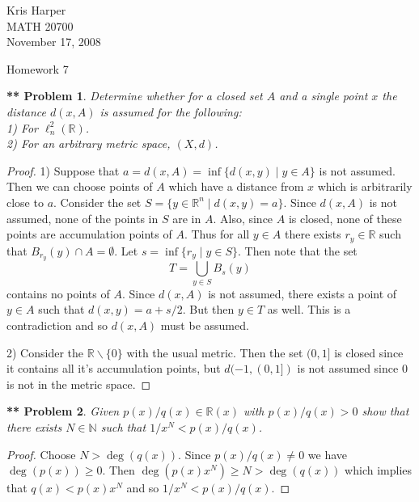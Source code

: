 \documentclass{article}
\newtheorem{**}{** Problem}
\begin{document}
\begin{flushright}
Kris Harper\\

MATH 20700\\

November 17, 2008
\end{flushright}

\begin{center}
Homework 7
\end{center}

\begin{flushleft}

\begin{**}
Determine whether for a closed set $A$ and a single point $x$ the distance $d(x, A)$ is assumed for the following:\\
1) For $\ell_n^2(\mathbb{R})$.\\
2) For an arbitrary metric space, $(X, d)$.
\end{**}
\begin{proof}
1) Suppose that $a = d(x,A) = \inf \{d(x,y) \mid y \in A\}$ is not assumed. Then we can choose points of $A$ which have a distance from $x$ which is arbitrarily close to $a$. Consider the set $S = \{y \in \mathbb{R}^n \mid d(x,y) = a\}$. Since $d(x, A)$ is not assumed, none of the points in $S$ are in $A$. Also, since $A$ is closed, none of these points are accumulation points of $A$. Thus for all $y \in A$ there exists $r_y \in \mathbb{R}$ such that $B_{r_y} (y) \cap A = \emptyset$. Let $s = \inf \{r_y \mid y \in S\}$. Then note that the set
\[
T = \bigcup_{y \in S} B_s(y)
\]
contains no points of $A$. Since $d(x, A)$ is not assumed, there exists a point of $y \in A$ such that $d(x,y) = a + s/2$. But then $y \in T$ as well. This is a contradiction and so $d(x, A)$ must be assumed.\newline

2) Consider the $\mathbb{R} \backslash \{0\}$ with the usual metric. Then the set $(0,1]$ is closed since it contains all it's accumulation points, but $d(-1, (0,1])$ is not assumed since $0$ is not in the metric space.
\end{proof}

\begin{**}
Given $p(x)/q(x) \in \mathbb{R}(x)$ with $p(x)/q(x) > 0$ show that there exists $N \in \mathbb{N}$ such that $1/x^N < p(x)/q(x)$.
\end{**}
\begin{proof}
Choose $N > \deg(q(x))$. Since $p(x)/q(x) \neq 0$ we have $\deg(p(x)) \geq 0$. Then $\deg(p(x) x^N) \geq N > \deg(q(x))$ which implies that $q(x) < p(x) x^N$ and so $1/x^N < p(x)/q(x)$.
\end{proof}


\end{flushleft}
\end{document}

